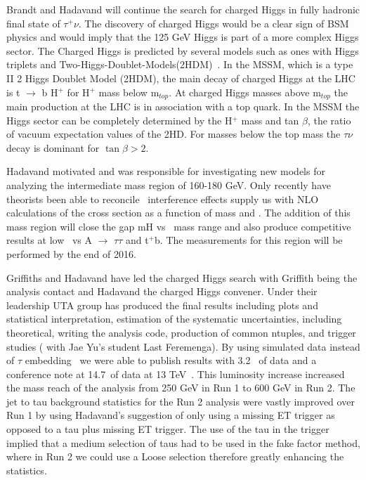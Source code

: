Brandt and Hadavand will continue the search for charged Higgs in fully hadronic final state of $\tau^+ \nu$.  The discovery of charged Higgs  would be a clear sign of BSM physics 
and would imply that the 125 GeV Higgs is part of a more complex Higgs sector. 
The Charged Higgs is predicted by several models such as ones with Higgs triplets and Two-Higgs-Doublet-Models(2HDM)~\cite{2hdm1,2hdm2,2hdm3}. 
In the MSSM, which is a type II 2 Higgs Doublet Model (2HDM), the main decay of charged Higgs at the LHC is t $\rightarrow$ b H$^+$ for H$^+$ mass below m$_{top}$. At charged Higgs masses above m$_{top}$
the main production at the LHC is in association with a top quark.  In the MSSM the Higgs sector can be completely determined by the H$^+$ mass and tan $\beta$, the ratio of vacuum expectation values of the 2HD.
For masses below the top mass the $\tau \nu$ decay is dominant for $\tan \beta >2 $. 

Hadavand motivated and was responsible for investigating new models for analyzing the intermediate mass region of 160-180 GeV.
Only recently have theorists been able to reconcile \ttbar\ interference effects supply us with NLO  calculations of the cross section as a function of mass and \tanb.
The addition of this mass region will close the gap mH vs \tanb\ mass range and also produce competitive results at low \tanb\ vs A $\rightarrow$ $\tau \tau$ and \Hp \too t$^+$b.  
The measurements for this region will be performed by the end of 2016.

Griffiths and Hadavand have led the charged Higgs search with Griffith being the analysis contact and Hadavand the charged Higgs convener.  Under their leadership UTA group has produced the final results including plots and statistical
interpretation, estimation of the systematic uncertainties, including theoretical, writing the analysis code, production of common ntuples, and trigger studies ( with Jae Yu's student Last Feremenga).  
By using simulated \ttbar data instead of $\tau$ embedding~\cite{embedding} we were able to publish results with 3.2 \invfb\ of data and a conference note at 14.7\invfb\ of data at 13 TeV~\cite{taunu,hptnu1}.  This luminosity increase increased the mass reach of the analysis from 250 GeV in Run 1 to 600 GeV in Run 2.
The jet to tau background statistics for the Run 2 analysis were vastly improved over Run 1 by using Hadavand's suggestion of only using a missing ET trigger as opposed to a tau plus missing ET trigger.  The use of the tau in the trigger implied that a medium selection of taus had to be used in the fake factor method, 
where in Run 2 we could use a Loose selection therefore greatly enhancing the statistics.

